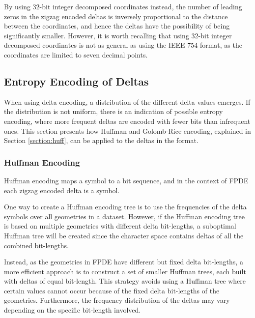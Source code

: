 By using 32-bit integer decomposed coordinates instead, the number of leading zeros in the zigzag encoded deltas is inversely proportional to the distance between the coordinates, and hence the deltas have the possibility of being significantly smaller. However, it is worth recalling that using 32-bit integer decomposed coordinates is not as general as using the IEEE 754 format, as the coordinates are limited to seven decimal points.


\subsection{Entropy Encoding of Deltas}
When using delta encoding, a distribution of the different delta values emerges. If the distribution is not uniform, there is an indication of possible entropy encoding, where more frequent deltas are encoded with fewer bits than infrequent ones. This section presents how Huffman and Golomb-Rice encoding, explained in Section \ref{section:huff}, can be applied to the deltas in the format. %

%         


\subsubsection{Huffman Encoding}
Huffman encoding maps a symbol to a bit sequence, and in the context of FPDE each zigzag encoded delta is a symbol.

One way to create a Huffman encoding tree is to use the frequencies of the delta symbols over all geometries in a dataset. However, if the Huffman encoding tree is based on multiple geometries with different delta bit-lengths, a suboptimal Huffman tree will be created since the character space contains deltas of all the combined bit-lengths. 

Instead, as the geometries in FPDE have different but fixed delta bit-lengths, a more efficient approach is to construct a set of smaller Huffman trees, each built with deltas of equal bit-length. This strategy avoids using a Huffman tree where certain values cannot occur because of the fixed delta bit-lengths of the geometries. Furthermore, the frequency distribution of the deltas may vary depending on the specific bit-length involved.

